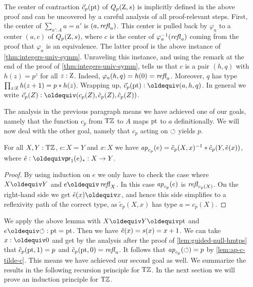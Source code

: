 \documentclass[a4paper,12pt]{amsart}
\begin{document}
The center of contraction $\vec{c}_p({\mathord{\mathrm{pt}}})$ of $Q_p(\mathrm{Z},s)$ is 
implicitly defined in the above proof 
and can be uncovered by a careful analysis of all proof-relevant steps.
First, the center of $\sum_{a':A} a=a'$ is $(a,\mathop{{\it refl}_{a}})$.
This center is pulled back by $\varphi_{a}$ to a center
$(a,c)$ of $Q_p(\mathrm{Z},s)$, where $c$ is the center of 
$\varphi_{a}^{-1}(\mathop{{\it refl}_{a}})$ coming from the proof
that $\varphi_{a}$ is an equivalence. The latter proof
is the above instance of \cref{thm:integers-univ-symm}.
Unraveling this instance, and using the remark at the
end of the proof of \cref{thm:integers-univ-symm},
tells us that $c$ is a pair $(h,q)$ with $h(z)=p^z$
for all $z:\mathrm{Z}$. Indeed, $\varphi_{a}(h,q) = h(0) = \mathop{{\it refl}_{a}}$.
Moreover, $q$ has type $\prod_{z:\mathrm{Z}} h(z+1)=p* h(z)$.
Wrapping up, $\vec c_p(\pt)\defeq (a,h,q)$. In general we write
$\vec{c}_p(Z)\defeq(c_p(Z),\tilde{c}_p(Z),\hat{c}_p(Z))$.

The analysis in the previous paragraph
means we have achieved one of our goals,
namely that the function $c_p$ from ${\mathrm{T}\mathbb{Z}}$ to $A$ 
maps ${\mathord{\mathrm{pt}}}$ to $a$ definitionally.
We will now deal with the other goal,
namely that $c_p$ acting on $\circlearrowleft$ yields $p$.

\begin{lemma}\label{lem:ap-c-tilde-c}
For all $X,Y:{\mathrm{T}\mathbb{Z}}$, $e: X=Y$ and $x:X$ we have
$\mathop{{\it ap}_{c_p}}(e) = \tilde c_p(X,x)^{-1}* \tilde c_p(Y,\tilde {e}(x))$,
where $\ptoe{e}\defeq \mathsf{pr}_1(e)_* : X\to Y$.
\end{lemma}
\begin{proof}
By using induction on $e$ we only have to check the case where
$X\jdeq Y$ and $e\jdeq\refl{X}$. In this case $\mathop{{\it ap}_{c_p}}(e)$ is
$\mathop{{\it refl}_{c_p(X)}}$. On the right-hand side we get $\ptoe{e}(x)\jdeq x$,
and hence this side simplifies to a reflexivity path of
the correct type, as $\tilde c_p(X,x)$ has type $a=c_p(X)$.
\end{proof}

We apply the above lemma with $X\jdeq Y\jdeq \pt$ and $e\jdeq{\Zloop}: \pt=\pt$.
Then we have $\tilde {e}(x)=s(x)=x+1$. We can take $x\defeq 0$ and get by
the analysis after the proof of \cref{lem:guided-null-hmtps}
that $\tilde c_p({\mathord{\mathrm{pt}}},1) = p$ and $\tilde c_p({\mathord{\mathrm{pt}}},0) = \mathop{{\it refl}_{a}}$.
It follows that $\mathop{{\it ap}_{c_p}}(\circlearrowleft) = p$ by \cref{lem:ap-c-tilde-c}.
This means we have achieved our second goal as well.
We summarize the results in the following recursion principle for ${\mathrm{T}\mathbb{Z}}$.
In the next section we will prove an induction principle for ${\mathrm{T}\mathbb{Z}}$.
\end{document}
